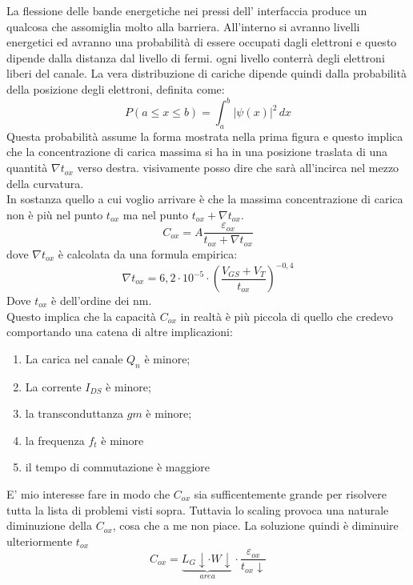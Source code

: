 %
 La flessione delle bande energetiche nei pressi dell' interfaccia produce un qualcosa che assomiglia molto alla barriera. All'interno si avranno livelli energetici ed avranno una probabilità di essere occupati dagli elettroni e questo dipende dalla distanza dal livello di fermi. ogni livello conterrà degli elettroni liberi del canale.
 La vera distribuzione di cariche dipende quindi dalla probabilità della posizione degli elettroni, definita come:
 \begin{equation}
     P(a \leq x \leq b) = \int_{a}^{b} |\psi(x)|^2 \,dx
 \end{equation}
 Questa probabilità assume la forma mostrata nella prima figura e questo implica che la concentrazione di carica massima si ha in una posizione traslata di una quantità $\nabla t_{ox}$ verso destra. visivamente posso dire che sarà all'incirca nel mezzo della curvatura.\\
 In sostanza quello a cui voglio arrivare è che la massima concentrazione di carica non è più nel punto $t_{ox}$ ma nel punto $t_{ox}+\nabla t_{ox}$.
 \begin{equation}
     C_{ox}= A \dfrac{\varepsilon_{ox}}{t_{ox}+\nabla t_{ox}}
 \end{equation}
 dove $\nabla t_{ox}$ è calcolata da una formula empirica:
 \begin{equation}
     \nabla t_{ox}=6,2\cdot 10^{-5} \cdot \left( \dfrac{V_{GS}+V_T}{t_{ox}}\right)^{-0,4}
 \end{equation}
 Dove $t_{ox}$ è dell'ordine dei nm.\\
 Questo implica che la capacità $C_{ox}$ in realtà è più piccola di quello che credevo comportando una catena di altre implicazioni:
 \begin{enumerate}
     \item La carica nel canale $Q_n$ è minore;
     \item La corrente $I_{DS}$ è minore;
     \item la transconduttanza $gm$ è minore;
     \item la frequenza $f_t$ è minore
     \item il tempo di commutazione è maggiore
 \end{enumerate}
 E' mio interesse fare in modo che $C_{ox}$ sia sufficentemente grande per risolvere tutta la lista di problemi visti sopra. Tuttavia lo scaling provoca una naturale diminuzione della $C_{ox}$, cosa che a me non piace. La soluzione quindi è diminuire ulteriormente $t_{ox}$
  \begin{equation}
     C_{ox} = \underbrace{L_G\downarrow \cdot W \downarrow }_{area} \cdot \dfrac{\varepsilon_{ox}}{t_{ox}\downarrow}
 \end{equation}
